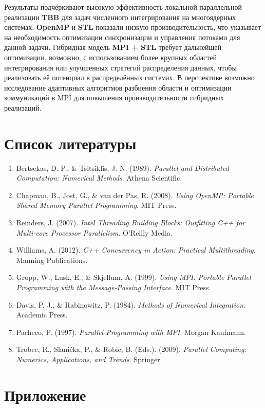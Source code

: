 \documentclass[12pt]{article}
\begin{document}
\hspace*{1.25em}Результаты подчёркивают высокую эффективность локальной параллельной реализации \textbf{TBB} для задач численного интегрирования на многоядерных системах. \textbf{OpenMP} и \textbf{STL} показали низкую производительность, что указывает на необходимость оптимизации синхронизации и управления потоками для данной задачи. Гибридная модель \textbf{MPI + STL} требует дальнейшей оптимизации, возможно, с использованием более крупных областей интегрирования или улучшенных стратегий распределения данных, чтобы реализовать её потенциал в распределённых системах. В перспективе возможно исследование адаптивных алгоритмов разбиения области и оптимизации коммуникаций в MPI для повышения производительности гибридных реализаций.

\section{Список литературы}
\begin{enumerate}
    \item Bertsekas, D. P., \& Tsitsiklis, J. N. (1989). \textit{Parallel and Distributed Computation: Numerical Methods}. Athena Scientific.
    \item Chapman, B., Jost, G., \& van der Pas, R. (2008). \textit{Using OpenMP: Portable Shared Memory Parallel Programming}. MIT Press.
    \item Reinders, J. (2007). \textit{Intel Threading Building Blocks: Outfitting C++ for Multi-core Processor Parallelism}. O'Reilly Media.
    \item Williams, A. (2012). \textit{C++ Concurrency in Action: Practical Multithreading}. Manning Publications.
    \item Gropp, W., Lusk, E., \& Skjellum, A. (1999). \textit{Using MPI: Portable Parallel Programming with the Message-Passing Interface}. MIT Press.
    \item Davis, P. J., \& Rabinowitz, P. (1984). \textit{Methods of Numerical Integration}. Academic Press.
    \item Pacheco, P. (1997). \textit{Parallel Programming with MPI}. Morgan Kaufmann.
    \item Trobec, R., Slanička, P., \& Robic, B. (Eds.). (2009). \textit{Parallel Computing: Numerics, Applications, and Trends}. Springer.
\end{enumerate}
\appendix
\section*{Приложение}
\end{document}
